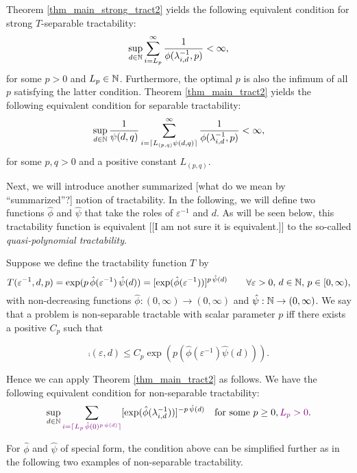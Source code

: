 \documentclass[sort&compress]{elsarticle}
\newcommand{\peter}[1]{\begingroup\color{violet}#1\endgroup}
\newcommand{\kachi}[1]{\begingroup\color{ForestGreen}#1\endgroup}
\begin{document}
\begin{example}
Theorem \ref{thm_main_strong_tract2} yields the following equivalent condition for strong $T$-separable tractability:
\begin{equation*} \label{eq:strong_tractiff}
     \sup_{d \in \mathbb{N}} \sum_{i = L_p}^\infty \frac{1}{\phi(\lambda_{i, d}^{-1},p)} < \infty,
\end{equation*}
for some $p>0$ and $L_p \in \mathbb{N}$. Furthermore, the optimal $p$ is also the infimum of all $p$ \peter{satisfying the latter condition}.
Theorem \ref{thm_main_tract2} yields the following equivalent condition for separable tractability:
\[
 \sup_{d \in \mathbb{N}} \frac{1}{\psi(d,q)} \sum_{i = \lceil L_{(p,q)}\psi(d,q)\rceil}^\infty \frac{1}{\phi(\lambda_{i, d}^{-1},p)} < \infty,
\] for some $p,q >0$ and \peter{a positive constant $L_{(p,q)}$}.
\end{example}
\kachi{Next, we will introduce another summarized \peter{[what do we mean by ``summarized''?]} notion of tractability. In the following, we will define two functions $\hat{\phi}$ and $\hat{\psi}$ that take the roles of $\varepsilon^{-1}$ and $d$. As will be seen below, this tractability function is equivalent \peter{[[I am not sure it is equivalent.]]} to the so-called \emph{quasi-polynomial tractability}.}
\
\begin{example}
    Suppose we define the tractability function $T$ by 
\[
 T(\varepsilon^{-1},d,p)= \exp (p \, \hat{\phi}(\varepsilon^{-1})\, \hat{\psi}(d)) = [\exp( \hat{\phi}(\varepsilon^{-1}))]^{p \, \hat{\psi}(d)}
 \qquad \forall \varepsilon > 0, \,  d \in \mathbb{N}, \, p\in [0,\infty),
\]  with non-decreasing functions $\hat{\phi} : (0,\infty) \to (0,\infty)$ and $\hat{\psi} : \mathbb{N} \to (0,\infty)$. 
We say that a problem is non-separable tractable with \peter{scalar} parameter $p$ iff there exists a positive $C_{p}$ such that

\[\comp(\varepsilon,d) 
\leq  C_{p}\exp (p(\hat{\phi}(\varepsilon^{-1})\hat{\psi}(d))).\]

Hence we can apply Theorem \ref{thm_main_tract2} as follows. We have the following equivalent condition for non-separable tractability:
\[
\sup_{d\in\mathbb{N}}\sum_{\peter{i=\lceil L_p\,\hat{\phi}(0)^{p \, \hat{\psi}(d)}\rceil}} [\exp ( \hat{\phi}(\lambda_{i,d}^{-1}))]^{-p \, \hat{\psi}(d)}\quad \text{for some } p \geq 0, \peter{L_p >0}.
\]

\end{example}
For $\hat{\phi}$ and $\hat{\psi}$ of special form, the condition above can be simplified further as in the following two examples of non-separable tractability. 
\end{document}
